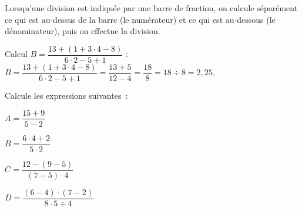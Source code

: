 \begin{aconnaitre}
Lorsqu’une division est indiquée par une barre de fraction, on calcule séparément ce qui est au-dessus de la barre (le numérateur) et ce qui est au-dessous (le dénominateur), puis on effectue la division.
\end{aconnaitre}



\begin{methode*1}

\begin{exemple*1}
Calcul $B = \dfrac{13 + (1+ 3 \cdot 4 - 8)}{6 \cdot 2 - 5 + 1}$ : \\[1em]
$B = \dfrac{13 + (1+ 3 \cdot 4 - 8)}{6 \cdot 2 - 5 + 1} = \dfrac{13 + 5}{12 - 4} = \dfrac{18}{8} = 18 \div 8 = 2,25$.
\end{exemple*1}


 \exercice 
Calcule les expressions suivantes :
\begin{colenumerate}{2}
\item $A=\dfrac{15 +9}{5 - 2}$\dotfill

\hfill

\dotfill

\item $B=\dfrac{6 \cdot 4 + 2}{5 \cdot 2}$\dotfill

\hfill

\dotfill

\item $C=\dfrac{12 - (9 - 5)}{(7- 5) \cdot 4}$\dotfill

\hfill

\dotfill

\item $D=\dfrac{(6 - 4) \cdot (7 - 2)}{8 \cdot 5 \div 4}$ \dotfill

\hfill

\dotfill

\hfill

\dotfill

 \end{colenumerate}

\end{methode*1}
